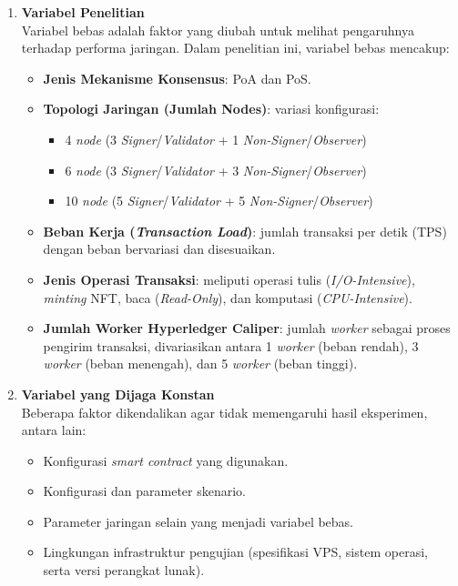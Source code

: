 \begin{enumerate}
    \item \textbf{Variabel Penelitian} \\
    Variabel bebas adalah faktor yang diubah untuk melihat pengaruhnya terhadap performa jaringan. Dalam penelitian ini, variabel bebas mencakup:
    \begin{itemize}
        \item \textbf{Jenis Mekanisme Konsensus}: PoA dan PoS.
        \item \textbf{Topologi Jaringan (Jumlah Nodes)}: variasi konfigurasi:
        \begin{itemize}
            \item 4 \textit{node} (3 \textit{Signer}/\textit{Validator} + 1 \textit{Non-Signer}/\textit{Observer})
            \item 6 \textit{node} (3 \textit{Signer}/\textit{Validator} + 3 \textit{Non-Signer}/\textit{Observer})
            \item 10 \textit{node} (5 \textit{Signer}/\textit{Validator} + 5 \textit{Non-Signer}/\textit{Observer})
        \end{itemize}
        \item \textbf{Beban Kerja (\textit{Transaction Load})}: jumlah transaksi per detik (TPS) dengan beban bervariasi dan disesuaikan.
        \item \textbf{Jenis Operasi Transaksi}: meliputi operasi tulis (\textit{I/O-Intensive}), \textit{minting} NFT, baca (\textit{Read-Only}), dan komputasi (\textit{CPU-Intensive}).
        \item \textbf{Jumlah Worker Hyperledger Caliper}: jumlah \textit{worker} sebagai proses pengirim transaksi, divariasikan antara 1 \textit{worker} (beban rendah), 3 \textit{worker} (beban menengah), dan 5 \textit{worker} (beban tinggi).
    \end{itemize}
    
    \item \textbf{Variabel yang Dijaga Konstan} \\
    Beberapa faktor dikendalikan agar tidak memengaruhi hasil eksperimen, antara lain:
    \begin{itemize}
        \item Konfigurasi \textit{smart contract} yang digunakan.
        \item Konfigurasi dan parameter skenario.
        \item Parameter jaringan selain yang menjadi variabel bebas.
        \item Lingkungan infrastruktur pengujian (spesifikasi VPS, sistem operasi, serta versi perangkat lunak).
    \end{itemize}
    

\end{enumerate}
